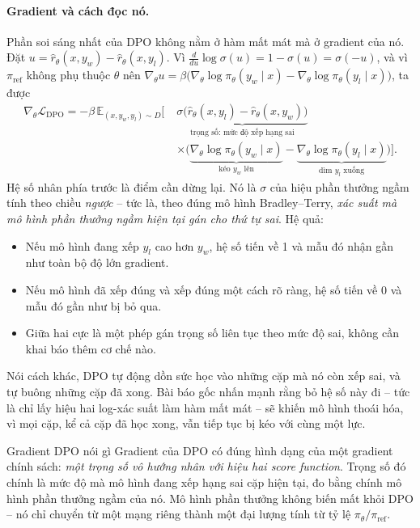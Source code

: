 \paragraph{Gradient và cách đọc nó.}
Phần soi sáng nhất của DPO không nằm ở hàm mất mát mà ở gradient của nó. Đặt \( u = \hat{r}_{\theta}(x,y_w) - \hat{r}_{\theta}(x,y_l) \). Vì \( \frac{d}{du}\log\sigma(u) = 1 - \sigma(u) = \sigma(-u) \), và vì \( \pi_{\text{ref}} \) không phụ thuộc \( \theta \) nên \( \nabla_{\theta} u = \beta\big(\nabla_{\theta}\log\pi_{\theta}(y_w \mid x) - \nabla_{\theta}\log\pi_{\theta}(y_l \mid x)\big) \), ta được
\[
\begin{aligned}
    \nabla_{\theta}\mathcal{L}_{\text{DPO}}
    = -\beta\, \mathbb{E}_{(x,y_w,y_l) \sim D}\Big[\;
    &\underbrace{\sigma\big(\hat{r}_{\theta}(x,y_l) - \hat{r}_{\theta}(x,y_w)\big)}_{\text{trọng số: mức độ xếp hạng sai}} \\[6pt]
    &\times \Big(
        \underbrace{\nabla_{\theta} \log \pi_{\theta}(y_w \mid x)}_{\text{kéo } y_w \text{ lên}}
        - \underbrace{\nabla_{\theta} \log \pi_{\theta}(y_l \mid x)}_{\text{dìm } y_l \text{ xuống}}
    \Big) \Big].
\end{aligned}
\]
Hệ số nhân phía trước là điểm cần dừng lại. Nó là \( \sigma \) của hiệu phần thưởng ngầm tính theo chiều \emph{ngược} -- tức là, theo đúng mô hình Bradley--Terry, \emph{xác suất mà mô hình phần thưởng ngầm hiện tại gán cho thứ tự sai}. Hệ quả:
\begin{itemize}
    \item Nếu mô hình đang xếp \( y_l \) cao hơn \( y_w \), hệ số tiến về 1 và mẫu đó nhận gần như toàn bộ độ lớn gradient.
    \item Nếu mô hình đã xếp đúng và xếp đúng một cách rõ ràng, hệ số tiến về 0 và mẫu đó gần như bị bỏ qua.
    \item Giữa hai cực là một phép gán trọng số liên tục theo mức độ sai, không cần khai báo thêm cơ chế nào.
\end{itemize}
Nói cách khác, DPO tự động dồn sức học vào những cặp mà nó còn xếp sai, và tự buông những cặp đã xong. Bài báo gốc nhấn mạnh rằng bỏ hệ số này đi -- tức là chỉ lấy hiệu hai log-xác suất làm hàm mất mát -- sẽ khiến mô hình thoái hóa, vì mọi cặp, kể cả cặp đã học xong, vẫn tiếp tục bị kéo với cùng một lực.

\begin{keyidea}{Gradient DPO nói gì}
Gradient của DPO có đúng hình dạng của một gradient chính sách: \emph{một trọng số vô hướng nhân với hiệu hai score function}. Trọng số đó chính là mức độ mà mô hình đang xếp hạng sai cặp hiện tại, đo bằng chính mô hình phần thưởng ngầm của nó. Mô hình phần thưởng không biến mất khỏi DPO -- nó chỉ chuyển từ một mạng riêng thành một đại lượng tính từ tỷ lệ \( \pi_{\theta}/\pi_{\text{ref}} \).
\end{keyidea}

